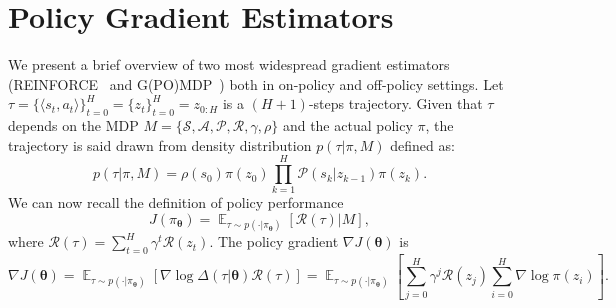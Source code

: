 \documentclass{article}
\theoremstyle{remark}
\theoremstyle{definition}
\DeclareMathOperator*{\EV}{\mathbb{E}}
\newcommand{\EVV}[2][\ppvect \in \ppspace]{\EV_{#1}\left[{#2}\right]}
\newcommand{\vtheta}{\boldsymbol{\theta}}
\newcommand{\Reward}{\mathcal{R}}
\newcommand{\pol}{\pi_{\vtheta}}
\newcommand{\gradJ}[1]{\nabla J(#1)}
\begin{document}



\clearpage
\onecolumn
\appendix

\section{Policy Gradient Estimators} \label{A:gradient_estimators}
We present a brief overview of two most widespread gradient estimators (REINFORCE~\citep{williams1992simple} and G(PO)MDP~\citep{baxter2001infinite}) both in on-policy and off-policy settings.
Let $\tau = \{\langle s_t,a_t \rangle\}_{t=0}^{H}= \{z_t\}_{t=0}^{H} = z_{0:H}$ is a $(H+1)$-steps trajectory.
Given that $\tau$ depends on the MDP $M=\{\mathcal{S},\mathcal{A}, \mathcal{P}, \Reward, \gamma, \rho\}$ and the actual policy $\pi$, the trajectory is
said drawn from density distribution $p(\tau|\pi,M)$ defined as:
\[
        p(\tau|\pi,M) = \rho(s_0) \pi(z_0) \prod_{k=1}^{H} \mathcal{P}(s_k|z_{k-1})\pi(z_k).
\]
We can now recall the definition of policy performance 
\[
        J(\pol) = \EVV[\tau \sim p(\cdot|\pol)]{\Reward(\tau)|M},
\]
where $\Reward(\tau) = \sum_{t=0}^{H}\gamma^t \Reward(z_t)$.
The policy gradient $\nabla J(\vtheta)$ is
\begin{equation}\label{E:onpolicygradient}
        \gradJ{\vtheta} = \EVV[\tau \sim p(\cdot|\pol)]{\nabla \log\Delta(\tau|\vtheta)\Reward(\tau)} = \EVV[\tau \sim p(\cdot|\pol)]{\sum_{j=0}^{H} \gamma^j \mathcal{R}(z_j) \sum_{i=0}^{H} \nabla \log\pi(z_i)}.
\end{equation}
\end{document}
